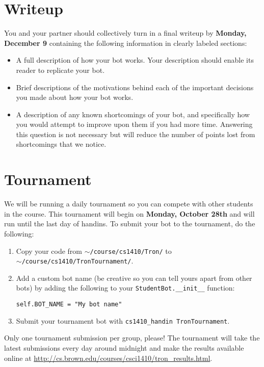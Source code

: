 \documentclass{article}
\begin{document}
\section{Writeup}
You and your partner should collectively turn in a final writeup by \textbf{Monday, December 9} containing the following information in clearly labeled sections:

\begin{itemize}
\item A full description of how your bot works. Your description should enable its reader to replicate your bot.

\item Brief descriptions of the motivations behind each of the important decisions you made about how your bot works.

\item A description of any known shortcomings of your bot, and specifically how you would attempt to improve upon them if you had more time. Answering this question is not necessary but will reduce the number of points lost from shortcomings that we notice.
\end{itemize}

\section{Tournament}
We will be running a daily tournament so you can compete with other students in the course. This tournament will begin on \textbf{Monday, October 28th} and will run until the last day of handins. To submit your bot to the tournament, do the following:
\begin{enumerate}
    \item Copy your code from \texttt{$\sim$/course/cs1410/Tron/} to \\ \texttt{$\sim$/course/cs1410/TronTournament/}.
    \item Add a custom bot name (be creative so you can tell yours apart from other bots) by adding the following to your \texttt{StudentBot.\_\_init\_\_} function:
    
    \hspace*{6mm} \texttt{self.BOT\_NAME = "My bot name"}
    \item Submit your tournament bot with \texttt{cs1410\_handin TronTournament}.
\end{enumerate}
Only one tournament submission per group, please! The tournament will take the latest submissions every day around midnight and make the results available online at \url{http://cs.brown.edu/courses/csci1410/tron_results.html}.
\end{document}
